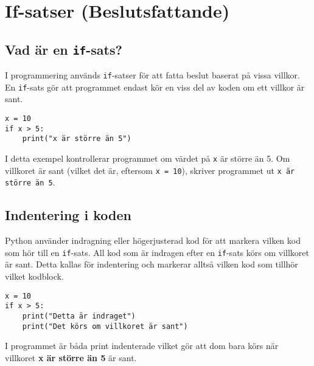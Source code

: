 
\section{If-satser (Beslutsfattande)}
\label{section:if}

\subsection{Vad är en \texttt{if}-sats?}
I programmering används \texttt{if}-satser för att fatta beslut baserat på vissa villkor. En \texttt{if}-sats gör att programmet endast kör en viss del av koden om ett villkor är sant.

\begin{lstlisting}[title=Exempel på if-sats]
x = 10
if x > 5:
    print("x är större än 5")
\end{lstlisting}

I detta exempel kontrollerar programmet om värdet på \texttt{x} är större än 5. Om villkoret är sant (vilket det är, eftersom \texttt{x = 10}), skriver programmet ut \texttt{x är större än 5}.


\subsection{Indentering i koden}
Python använder indragning eller högerjusterad kod för att markera vilken kod som hör till en \texttt{if}-sats. All kod som är indragen efter en \texttt{if}-sats körs om villkoret är sant.
Detta kallas för indentering och markerar alltså vilken kod som tillhör vilket kodblock.

\begin{lstlisting}[title=Indragning är viktigt]
x = 10
if x > 5:
    print("Detta är indraget")
    print("Det körs om villkoret är sant")
\end{lstlisting}

I programmet är båda print indenterade vilket gör att dom bara körs när villkoret
\textbf{x är större än 5} är sant. 

